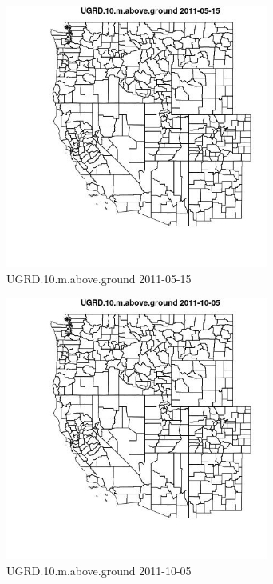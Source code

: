 \begin{figure} 
\centering  
\includegraphics[width=0.77\textwidth]{Code_Outputs/ML_input_report_ML_input_PM25_Step5_part_d_de_duplicated_aves_ML_input_MapObsUGRD10maboveground2011-05-15.jpg} 
\caption{\label{fig:ML_input_report_ML_input_PM25_Step5_part_d_de_duplicated_aves_ML_inputMapObsUGRD10maboveground2011-05-15}UGRD.10.m.above.ground 2011-05-15} 
\end{figure} 
 

\begin{figure} 
\centering  
\includegraphics[width=0.77\textwidth]{Code_Outputs/ML_input_report_ML_input_PM25_Step5_part_d_de_duplicated_aves_ML_input_MapObsUGRD10maboveground2011-10-05.jpg} 
\caption{\label{fig:ML_input_report_ML_input_PM25_Step5_part_d_de_duplicated_aves_ML_inputMapObsUGRD10maboveground2011-10-05}UGRD.10.m.above.ground 2011-10-05} 
\end{figure} 
 

